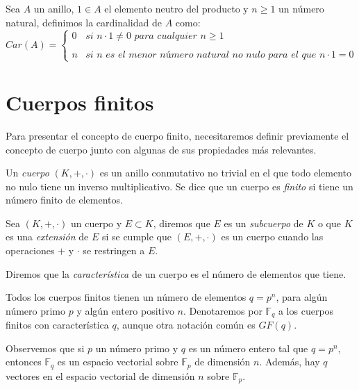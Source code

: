 \begin{definition}
    Sea $A$ un anillo, $1 \in A$ el elemento neutro del producto y $n \geq 1$ un número natural, definimos la cardinalidad de $A$ como:
    \[
        Car(A) = \left\{ \begin{array}{lc}
        0 &   \textit{si } n \cdot 1 \neq 0 \textit{ para cualquier } n \geq 1 \\
        \\ n & \textit{si n es el menor número natural no nulo para el que } n \cdot 1 = 0
        \end{array}
        \right.
    \]
\end{definition}


\section{Cuerpos finitos}

Para presentar el concepto de cuerpo finito, necesitaremos definir previamente el concepto de cuerpo junto con algunas de sus propiedades más relevantes.

\begin{definition}
    Un \emph{cuerpo} $(K, +, \cdot)$ es un anillo conmutativo no trivial en el que todo elemento no nulo tiene un inverso multiplicativo. Se dice que un cuerpo es \emph{finito} si tiene un número finito de elementos.
\end{definition}

Sea $(K, +, \cdot)$ un cuerpo y $E \subset K$, diremos que $E$ es un \emph{subcuerpo} de $K$ o que $K$ es una \emph{extensión} de $E$ si se cumple que $(E, +, \cdot)$ es un cuerpo cuando las operaciones $+$ y $\cdot$ se restringen a $E$.

Diremos que la \emph{característica} de un cuerpo es el número de elementos que tiene.

Todos los cuerpos finitos tienen un número de elementos $q = p^n$, para algún número primo $p$ y algún entero positivo $n$. Denotaremos por $\mathbb{F}_q$ a los cuerpos finitos con característica $q$, aunque otra notación común es $GF(q)$.

Observemos que si $p$ un número primo y $q$ es un número entero tal que $q = p^n$, entonces $\mathbb{F}_q$ es un espacio vectorial sobre $\mathbb{F}_p$ de dimensión $n$. Además, hay $q$ vectores en el espacio vectorial de dimensión $n$ sobre $\mathbb{F}_p$.

